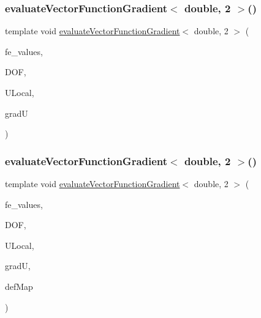 \mbox{\label{function_evaluations_8cc_a268d56529013650c702d05cd22cf6148}} 
\subsubsection{\texorpdfstring{evaluateVectorFunctionGradient$<$ double, 2 $>$()}{evaluateVectorFunctionGradient< double, 2 >()}\hspace{0.1cm}{\footnotesize\ttfamily [1/4]}}
{\footnotesize\ttfamily template void \mbox{\hyperlink{group___evaluation_functions_ga9608539d601a91aff1ba01ccc720fbe0}{evaluate\+Vector\+Function\+Gradient}}$<$ double, 2 $>$ (\begin{DoxyParamCaption}\item[{const F\+E\+Values$<$ 2 $>$ \&}]{fe\+\_\+values,  }\item[{unsigned int}]{D\+OF,  }\item[{Table$<$ 1, double $>$ \&}]{U\+Local,  }\item[{Table$<$ 3, double $>$ \&}]{gradU }\end{DoxyParamCaption})}

\mbox{\label{function_evaluations_8cc_a2d6fafd5544183a2ed0f3190b142c853}} 
\subsubsection{\texorpdfstring{evaluateVectorFunctionGradient$<$ double, 2 $>$()}{evaluateVectorFunctionGradient< double, 2 >()}\hspace{0.1cm}{\footnotesize\ttfamily [2/4]}}
{\footnotesize\ttfamily template void \mbox{\hyperlink{group___evaluation_functions_ga9608539d601a91aff1ba01ccc720fbe0}{evaluate\+Vector\+Function\+Gradient}}$<$ double, 2 $>$ (\begin{DoxyParamCaption}\item[{const F\+E\+Values$<$ 2 $>$ \&}]{fe\+\_\+values,  }\item[{unsigned int}]{D\+OF,  }\item[{Table$<$ 1, double $>$ \&}]{U\+Local,  }\item[{Table$<$ 3, double $>$ \&}]{gradU,  }\item[{\mbox{\hyperlink{structdeformation_map}{deformation\+Map}}$<$ double, 2 $>$ \&}]{def\+Map }\end{DoxyParamCaption})}

